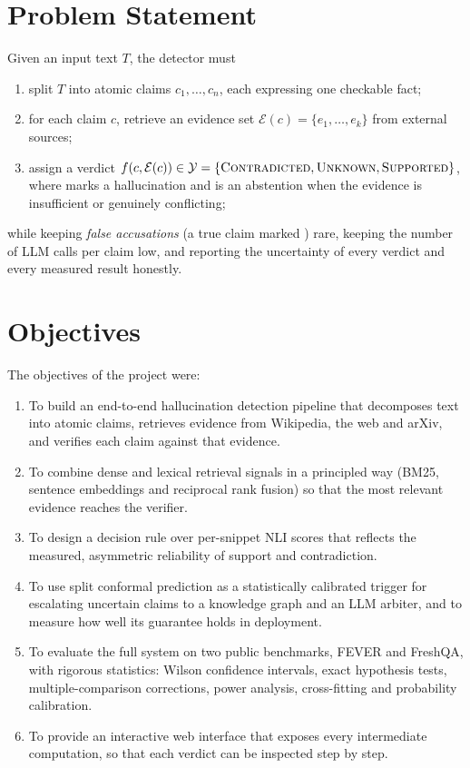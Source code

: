 \section{Problem Statement}

Given an input text $T$, the detector must
\begin{enumerate}[itemsep=0.2em]
  \item split $T$ into atomic claims $c_1, \dots, c_n$, each expressing one checkable fact;
  \item for each claim $c$, retrieve an evidence set $\mathcal{E}(c) = \{e_1, \dots, e_k\}$ from external sources;
  \item assign a verdict $f(c, \mathcal{E}(c)) \in \mathcal{Y} = \{\textsc{Contradicted}, \textsc{Unknown}, \textsc{Supported}\}$, where \Con{} marks a hallucination and \Unk{} is an abstention when the evidence is insufficient or genuinely conflicting;
\end{enumerate}
while keeping \emph{false accusations} (a true claim marked \Con) rare, keeping the number of LLM calls per claim low, and reporting the uncertainty of every verdict and every measured result honestly.

\section{Objectives}

The objectives of the project were:
\begin{enumerate}[itemsep=0.2em]
  \item To build an end-to-end hallucination detection pipeline that decomposes text into atomic claims, retrieves evidence from Wikipedia, the web and arXiv, and verifies each claim against that evidence.
  \item To combine dense and lexical retrieval signals in a principled way (BM25, sentence embeddings and reciprocal rank fusion) so that the most relevant evidence reaches the verifier.
  \item To design a decision rule over per-snippet NLI scores that reflects the measured, asymmetric reliability of support and contradiction.
  \item To use split conformal prediction as a statistically calibrated trigger for escalating uncertain claims to a knowledge graph and an LLM arbiter, and to measure how well its guarantee holds in deployment.
  \item To evaluate the full system on two public benchmarks, FEVER and FreshQA, with rigorous statistics: Wilson confidence intervals, exact hypothesis tests, multiple-comparison corrections, power analysis, cross-fitting and probability calibration.
  \item To provide an interactive web interface that exposes every intermediate computation, so that each verdict can be inspected step by step.
\end{enumerate}

